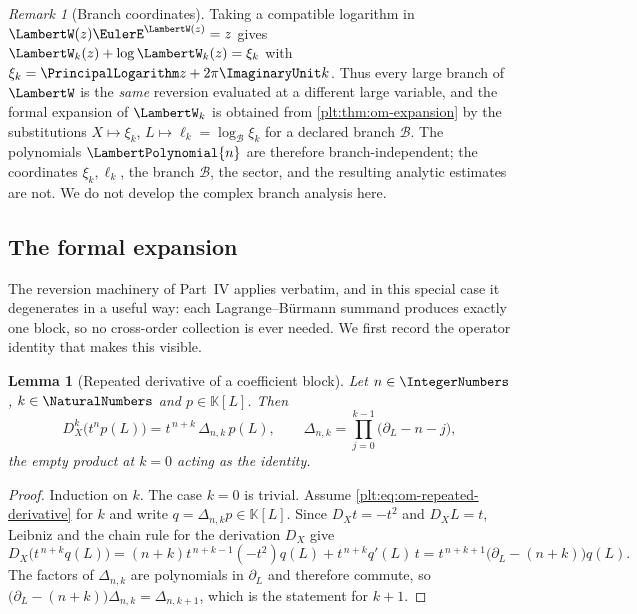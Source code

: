 \documentclass[11pt,oneside]{article}
\theoremstyle{plain}
\newtheorem{lemma}[theorem]{Lemma}
\theoremstyle{definition}
\theoremstyle{remark}
\newtheorem{remark}[theorem]{Remark}
\newcommand{\K}{\mathbb{K}}
\newcommand{\DX}{D_{X}}                                  %
\newcommand{\shiftop}[2]{\Delta_{#1,#2}}                 %
\newcommand{\LamP}[1]{\LambertPolynomial{#1}}
\begin{document}
\begin{remark}[Branch coordinates]
\label{plt:rmk:om-branches}
Taking a compatible logarithm in \(\LambertW(z)\EulerE^{\LambertW(z)}=z\)
gives \(\LambertW_k(z)+\log\LambertW_k(z)=\xi_k\) with
\(\xi_k=\PrincipalLogarithm z+2\pi\ImaginaryUnit k\).  Thus every large
branch of \(\LambertW\) is the \emph{same} reversion evaluated at a different
large variable, and the formal expansion of \(\LambertW_k\) is obtained from
\cref{plt:thm:om-expansion} by the substitutions \(X\mapsto\xi_k\),
\(L\mapsto\ell_k=\log_{\mathcal B}\xi_k\) for a declared branch
\(\mathcal B\).  The polynomials \(\LamP{n}\) are therefore
branch-independent; the coordinates \(\xi_k,\ell_k\), the branch
\(\mathcal B\), the sector, and the resulting analytic estimates are not.  We
do not develop the complex branch analysis here.
\end{remark}

\subsection{The formal expansion}
\label{plt:sec:om-expansion}

The reversion machinery of Part~IV applies verbatim, and in this special case
it degenerates in a useful way: each Lagrange--B\"urmann summand produces
exactly one block, so no cross-order collection is ever needed.  We first
record the operator identity that makes this visible.

\begin{lemma}[Repeated derivative of a coefficient block]
\label{plt:lem:om-repeated-derivative}
Let \(n\in\IntegerNumbers\), \(k\in\NaturalNumbers\) and \(p\in\K[L]\).  Then
\begin{equation}\label{plt:eq:om-repeated-derivative}
 \DX^{k}\bigl(t^{n}p(L)\bigr)=t^{\,n+k}\,\shiftop{n}{k}\,p(L),
 \qquad
 \shiftop{n}{k}=\prod_{j=0}^{k-1}\bigl(\partial_L-n-j\bigr),
\end{equation}
the empty product at \(k=0\) acting as the identity.
\end{lemma}

\begin{proof}
Induction on \(k\).  The case \(k=0\) is trivial.  Assume
\eqref{plt:eq:om-repeated-derivative} for \(k\) and write
\(q=\shiftop{n}{k}p\in\K[L]\).  Since \(\DX t=-t^{2}\) and \(\DX L=t\),
Leibniz and the chain rule for the derivation \(\DX\) give
\[
 \DX\bigl(t^{\,n+k}q(L)\bigr)
 =(n+k)t^{\,n+k-1}(-t^{2})q(L)+t^{\,n+k}q'(L)\,t
 =t^{\,n+k+1}\bigl(\partial_L-(n+k)\bigr)q(L).
\]
The factors of \(\shiftop{n}{k}\) are polynomials in \(\partial_L\) and
therefore commute, so
\(\bigl(\partial_L-(n+k)\bigr)\shiftop{n}{k}=\shiftop{n}{k+1}\), which is the
statement for \(k+1\).
\end{proof}
\end{document}
